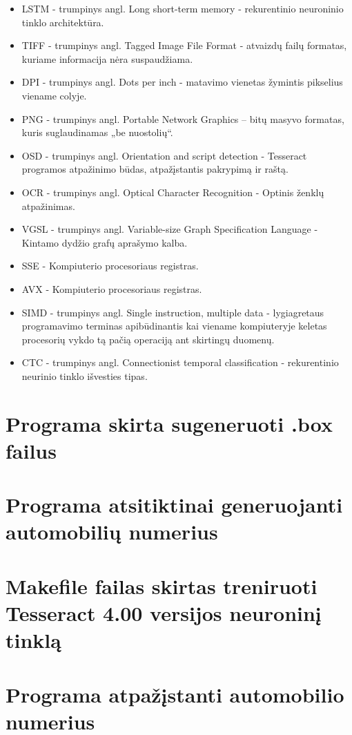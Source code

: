 \documentclass{VUMIFInfBakalaurinis}
\begin{document}
\begin{itemize}[itemsep=0.5pt]
  \item LSTM - trumpinys angl. Long short-term memory - rekurentinio neuroninio tinklo architektūra.
  \item TIFF - trumpinys angl. Tagged Image File Format - atvaizdų failų formatas, kuriame informacija nėra suspaudžiama.
  \item DPI - trumpinys angl. Dots per inch - matavimo vienetas žymintis pikselius viename colyje.
  \item PNG - trumpinys angl. Portable Network Graphics – bitų masyvo formatas, kuris suglaudinamas „be nuostolių“. 
  \item OSD - trumpinys angl. Orientation and script detection - Tesseract programos atpažinimo būdas, atpažįstantis pakrypimą ir raštą.
  \item OCR - trumpinys angl.  Optical Character Recognition - Optinis ženklų atpažinimas.
  \item VGSL - trumpinys angl. Variable-size Graph Specification Language - Kintamo dydžio grafų aprašymo kalba.
  \item SSE - Kompiuterio procesoriaus registras.
  \item AVX - Kompiuterio procesoriaus registras.
  \item SIMD - trumpinys angl. Single instruction, multiple data - lygiagretaus programavimo terminas apibūdinantis kai viename kompiuteryje keletas procesorių vykdo tą pačią operaciją ant skirtingų duomenų.
  \item CTC - trumpinys angl. Connectionist temporal classification - rekurentinio neurinio tinklo išvesties tipas.
\end{itemize}

\appendix  %

\section{Programa skirta sugeneruoti .box failus}


\section{Programa atsitiktinai generuojanti automobilių numerius}


\section{Makefile failas skirtas treniruoti Tesseract 4.00 versijos neuroninį tinklą}


\section{Programa atpažįstanti automobilio numerius}

\end{document}
